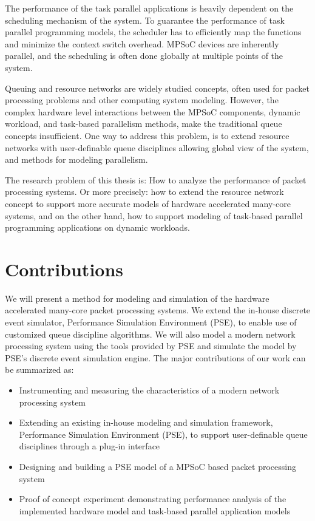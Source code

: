 The performance of the task parallel applications is heavily dependent on the scheduling mechanism of the system. To guarantee the performance of task parallel programming models, the scheduler has to efficiently map the functions and minimize the context switch overhead. MPSoC devices are inherently parallel, and the scheduling is often done globally at multiple points of the system.

Queuing and resource networks are widely studied concepts, often used for packet processing problems and other computing system modeling. However, the complex hardware level interactions between the MPSoC components, dynamic workload, and task-based parallelism methods, make the traditional queue concepts insufficient. One way to address this problem, is to extend resource networks with user-definable queue disciplines allowing global view of the system, and methods for modeling parallelism.

The research problem of this thesis is: How to analyze the performance of packet processing systems. Or more precisely: how to extend the resource network concept to support more accurate models of hardware accelerated many-core systems, and on the other hand, how to support modeling of task-based parallel programming applications on dynamic workloads.

\section{Contributions}
We will present a method for modeling and simulation of the hardware accelerated many-core packet processing systems. We extend the in-house discrete event simulator, Performance Simulation Environment (PSE), to enable use of customized queue discipline algorithms. We will also model a modern network processing system using the tools provided by PSE and simulate the model by PSE's discrete event simulation engine. The major contributions of our work can be summarized as:

\begin{itemize}

\item Instrumenting and measuring the characteristics of a modern network processing system

\item Extending an existing in-house modeling and simulation framework, Performance Simulation Environment (PSE), to support user-definable queue disciplines through a plug-in interface

\item Designing and building a PSE model of a MPSoC based packet processing system

\item Proof of concept experiment demonstrating performance analysis of the implemented hardware model and task-based parallel application models

\end{itemize}

